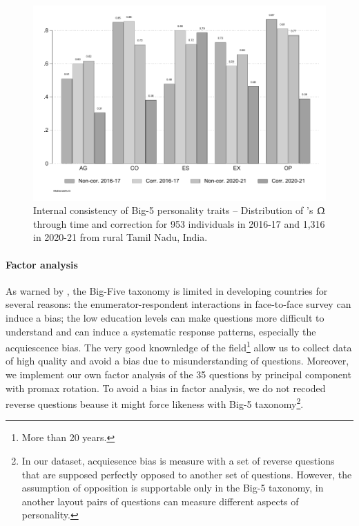 \documentclass[a4paper, 11pt, onecolumn]{article}
\begin{document}
\begin{figure}[htpb]
\raggedright
\includegraphics[scale=0.5]{INPUT/omega}
\caption{Internal consistency of Big-5 personality traits -- Distribution of \citeauthor{McDonald1999}'s $\Upomega$ through time and correction for 953 individuals in 2016-17 and 1,316 in 2020-21 from rural Tamil Nadu, India.}
\label{fig:omega}
\end{figure}

\paragraph{Factor analysis}
As warned by \cite{Laajaj2019}, the Big-Five taxonomy is limited in developing countries for several reasons: the enumerator-respondent interactions in face-to-face survey can induce a bias; the low education levels can make questions more difficult to understand and can induce a systematic response patterns, especially the acquiescence bias.
The very good knownledge of the field\footnote{More than 20 years.} allow us to collect data of high quality and avoid a bias due to misunderstanding of questions.
Moreover, we implement our own factor analysis of the 35 questions by principal component with promax rotation.
To avoid a bias in factor analysis, we do not recoded reverse questions beause it might force likeness with Big-5 taxonomy\footnote{In our dataset, acquiesence bias is measure with a set of reverse questions that are supposed perfectly opposed to another set of questions.  However, the assumption of opposition is supportable only in the Big-5 taxonomy, in another layout pairs of questions can measure different aspects of personality.}.
\end{document}
